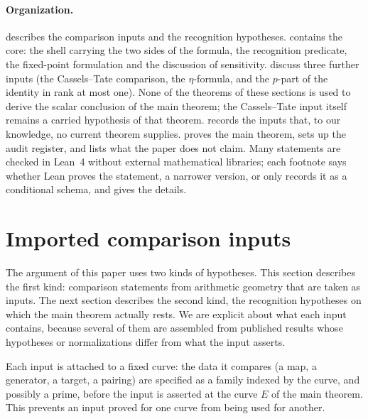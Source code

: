 \documentclass[11pt]{article}
\theoremstyle{definition}
\begin{document}
\paragraph{Organization.}
 describes the comparison inputs and
 the recognition hypotheses.
 contains the core: the shell carrying the two
sides of the formula, the recognition predicate, the fixed-point
formulation and the discussion of sensitivity.
 discuss three further
inputs (the Cassels--Tate comparison, the $\eta$-formula, and the $p$-part
of the identity in rank at most one).  None of the theorems of these
sections is used to derive the scalar conclusion of the main theorem; the
Cassels--Tate input itself remains a carried hypothesis of that theorem.   records the inputs that, to our
knowledge, no current theorem supplies.   proves the
main theorem,  sets up the audit register, and
 lists what the paper does not claim.  Many statements
are checked in Lean~4 without external mathematical libraries; each
footnote says whether Lean proves the statement, a narrower version, or
only records it as a conditional schema, and 
gives the details.
 \section{Imported comparison inputs}
\label{sec:imports}

The argument of this paper uses two kinds of hypotheses.  This section
describes the first kind: comparison statements from arithmetic geometry
that are taken as inputs.  The next section describes the second kind,
the recognition hypotheses on which the main theorem actually rests.  We
are explicit about what each input contains, because several of them are
assembled from published results whose hypotheses or normalizations
differ from what the input asserts.

Each input is attached to a fixed curve: the data it compares (a map, a
generator, a target, a pairing) are specified as a family indexed by the
curve, and possibly a prime, before the input is asserted at the curve
$E$ of the main theorem.  This prevents an input proved for one curve
from being used for another.
\end{document}
